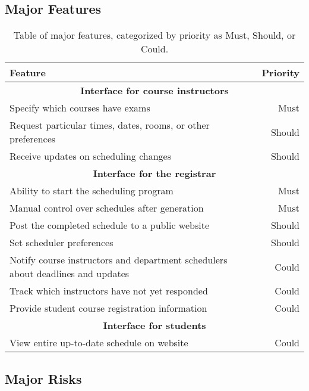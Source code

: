 \documentclass[11pt]{article}
\begin{document}
\subsection{Major Features} %
\begin{table}[htbp]
  \centering
  \begin{tabular} {| l | r |}
    \hline
    \textbf{Feature} & \textbf{Priority} \\ \hline \hline
    \multicolumn{2}{|c|}{\textbf{Interface for course instructors}} \\ \hline
    Specify which courses have exams & Must \\ \hline
    Request particular times, dates, rooms, or other preferences & Should \\ \hline
    Receive updates on scheduling changes & Should \\ \hline
    \multicolumn{2}{|c|}{\textbf{Interface for the registrar}} \\ \hline
    Ability to start the scheduling program & Must \\ \hline
    Manual control over schedules after generation & Must \\ \hline
    Post the completed schedule to a public website & Should \\ \hline 
    Set scheduler preferences & Should \\ \hline
    Notify course instructors and department schedulers about deadlines and updates & Could \\ \hline
    Track which instructors have not yet responded & Could \\ \hline
    Provide student course registration information & Could \\ \hline %
    \multicolumn{2}{|c|}{\textbf{Interface for students}} \\ \hline
    View entire up-to-date schedule on website & Could \\ \hline
  \end{tabular}
  \caption{Table of major features, categorized by priority as Must, Should, or Could.}
\end{table}

\subsection{Major Risks} %
\end{document}
